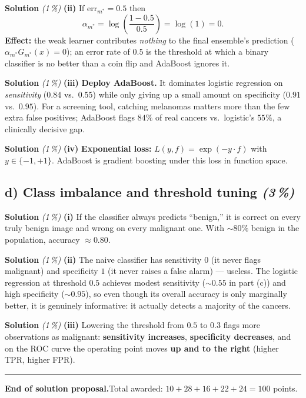 \documentclass[11pt,a4paper]{article}
\newcommand{\subpoints}[1]{\textit{(#1\,\%)}}
\newcommand{\sol}{\noindent\textbf{Solution}}
\begin{document}
\medskip
\sol{} \subpoints{1} \textbf{(ii)} If $\mathrm{err}_{m^*}=0.5$ then
$$\alpha_{m^*} = \log\!\left(\frac{1 - 0.5}{0.5}\right) = \log(1) = \boxed{0}.$$
\textbf{Effect:} the weak learner contributes \emph{nothing} to the final ensemble's prediction
($\alpha_{m^*}G_{m^*}(x) = 0$); an error rate of $0.5$ is the threshold at which a binary
classifier is no better than a coin flip and AdaBoost ignores it.

\medskip
\sol{} \subpoints{1} \textbf{(iii)} \textbf{Deploy AdaBoost.} It dominates logistic regression on
\emph{sensitivity} ($0.84$ vs.\ $0.55$) while only giving up a small amount on specificity
($0.91$ vs.\ $0.95$). For a screening tool, catching melanomas matters more than the few extra
false positives; AdaBoost flags $84\%$ of real cancers vs.\ logistic's $55\%$, a clinically
decisive gap.

\medskip
\sol{} \subpoints{1} \textbf{(iv)} \textbf{Exponential loss:} $\boxed{L(y, f) = \exp(-y\cdot f)}$
with $y\in\{-1, +1\}$. AdaBoost is gradient boosting under this loss in function space.

\subsection*{d) Class imbalance and threshold tuning \subpoints{3}}

\sol{} \subpoints{1} \textbf{(i)} If the classifier always predicts ``benign,'' it is correct on
every truly benign image and wrong on every malignant one. With $\sim 80\%$ benign in the
population, accuracy $\approx \boxed{0.80}$.

\medskip
\sol{} \subpoints{1} \textbf{(ii)} The naive classifier has sensitivity $0$ (it never flags
malignant) and specificity $1$ (it never raises a false alarm) --- useless. The logistic regression
at threshold $0.5$ achieves modest sensitivity ($\sim 0.55$ in part (c)) and high specificity
($\sim 0.95$), so even though its overall accuracy is only marginally better, it is genuinely
informative: it actually detects a majority of the cancers.

\medskip
\sol{} \subpoints{1} \textbf{(iii)} Lowering the threshold from $0.5$ to $0.3$ flags more
observations as malignant: \textbf{sensitivity increases}, \textbf{specificity decreases}, and on
the ROC curve the operating point moves \textbf{up and to the right} (higher TPR, higher FPR).

\vspace{1em}
\hrule
\vspace{0.5em}

\noindent\textbf{End of solution proposal.}\quad Total awarded: $10+28+16+22+24 = 100$ points.
\end{document}

